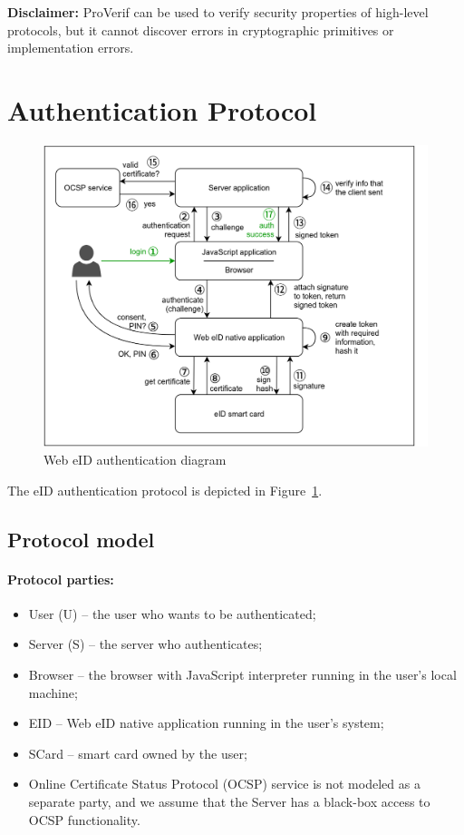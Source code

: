 \textbf{Disclaimer:} ProVerif can be used to verify security properties of high-level protocols, but it cannot discover errors in cryptographic primitives or implementation errors.


\section{Authentication Protocol}
\begin{figure}
\includegraphics[width=\columnwidth]{img/authentication.png}
\caption{Web eID authentication diagram}\label{fig:auth}
\end{figure}

The eID authentication protocol is depicted in Figure~\ref{fig:auth}.

\subsection{Protocol model}\label{sec:authmodel}

\paragraph{Protocol parties:}

\begin{itemize}
\item User (U)   -- the user who wants to be authenticated;
\item Server (S) -- the server who authenticates;
\item Browser    -- the browser with JavaScript interpreter running in the user's local machine;
\item EID        -- Web eID native application running in the user's system;
\item SCard      -- smart card owned by the user;
\item Online Certificate Status Protocol (OCSP) service is not modeled as a separate party, and we assume that the Server has a black-box access to OCSP functionality.
\end{itemize}

